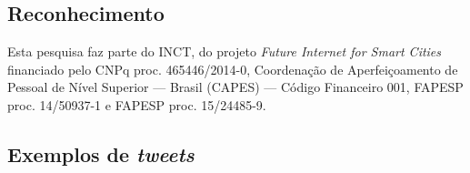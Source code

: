 \documentclass[
	12pt,				%
	oneside,			%
	a4paper,			%
	english,			%
	brazil				%
	]{abntex2ppgsi}
\begin{document}
{{\section*{Reconhecimento}

Esta pesquisa faz parte do INCT, do projeto \textit{Future Internet for Smart
Cities} financiado pelo CNPq proc. 465446/2014-0, Coordenação de
Aperfeiçoamento de Pessoal de Nível Superior --- Brasil (CAPES) ---
Código Financeiro 001, FAPESP proc. 14/50937-1 e FAPESP proc.
15/24485-9.

\postextual



%
%


\begin{apendicesenv}

\partapendices
\chapter{Exemplos de \textit{tweets}}
\label{apendiceA}


\end{apendicesenv}}}
\end{document}
